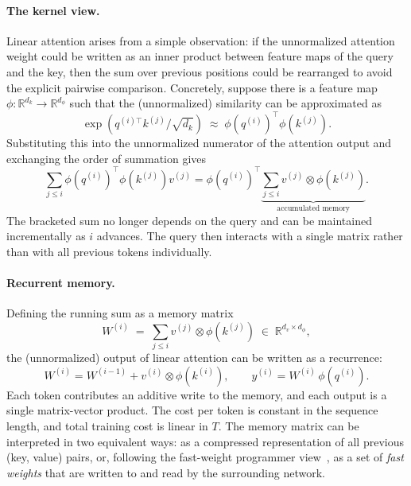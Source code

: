 \documentclass{article}
\newcommand{\phiMap}{\phi}
\begin{document}
\paragraph{The kernel view.}
Linear attention arises from a simple observation: if the unnormalized attention weight could be written as an inner product between feature maps of the query and the key, then the sum over previous positions could be rearranged to avoid the explicit pairwise comparison. Concretely, suppose there is a feature map $\phiMap : \mathbb{R}^{d_k} \to \mathbb{R}^{d_\phi}$ such that the (unnormalized) similarity can be approximated as
\begin{equation}
\exp\!\left( q^{(i)\top} k^{(j)} / \sqrt{d_k} \right)
\;\approx\;
\phiMap\!\left(q^{(i)}\right)^{\top} \phiMap\!\left(k^{(j)}\right).
\end{equation}
Substituting this into the unnormalized numerator of the attention output and exchanging the order of summation gives
\begin{equation}
\sum_{j \leq i}
\phiMap\!\left(q^{(i)}\right)^{\top} \phiMap\!\left(k^{(j)}\right) v^{(j)}
=
\phiMap\!\left(q^{(i)}\right)^{\top}
\underbrace{\sum_{j \leq i} v^{(j)} \otimes \phiMap\!\left(k^{(j)}\right)}_{\text{accumulated memory}}.
\end{equation}
The bracketed sum no longer depends on the query and can be maintained incrementally as $i$ advances. The query then interacts with a single matrix rather than with all previous tokens individually.

\paragraph{Recurrent memory.}
Defining the running sum as a memory matrix
\begin{equation}
W^{(i)}
\;=\;
\sum_{j \leq i} v^{(j)} \otimes \phiMap\!\left(k^{(j)}\right)
\;\in\; \mathbb{R}^{d_v \times d_\phi},
\end{equation}
the (unnormalized) output of linear attention can be written as a recurrence:
\begin{equation}
W^{(i)} = W^{(i-1)} + v^{(i)} \otimes \phiMap\!\left(k^{(i)}\right),
\qquad
y^{(i)} = W^{(i)} \, \phiMap\!\left(q^{(i)}\right).
\end{equation}
Each token contributes an additive write to the memory, and each output is a single matrix-vector product. The cost per token is constant in the sequence length, and total training cost is linear in $T$. The memory matrix can be interpreted in two equivalent ways: as a compressed representation of all previous (key, value) pairs, or, following the fast-weight programmer view~\cite{schlag2021linear}, as a set of \emph{fast weights} that are written to and read by the surrounding network.
\end{document}
